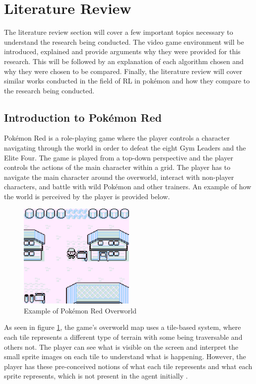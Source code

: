 \section{Literature Review}

The literature review section will cover a few important topics necessary to understand the research being conducted. The video game environment will be introduced, explained and provide arguments why they were provided for this research. This will be followed by an explanation of each algorithm chosen and why they were chosen to be compared. Finally, the literature review will cover similar works conducted in the field of RL in pokémon and how they compare to the research being conducted.

\subsection{Introduction to Pokémon Red}

Pokémon Red is a role-playing game where the player controls a character navigating through the world in order to defeat the eight Gym Leaders and the Elite Four. The game is played from a top-down perspective and the player controls the actions of the main character within a grid. The player has to navigate the main character around the overworld, interact with non-player characters, and battle with wild Pokémon and other trainers. An example of how the world is perceived by the player is provided below\cite{HubZ_1998}. 

\begin{figure}[H]
    \centering
    \includegraphics[width=0.5\textwidth]{figures/red_pallet_town.png}
    \caption{Example of Pokémon Red Overworld}
    \label{fig:pkmn_overworld}
\end{figure}

As seen in figure \ref{fig:pkmn_overworld}, the game's overworld map uses a tile-based system, where each tile represents a different type of terrain with some being traversable and others not. The player can see what is visible on the screen and interpret the small sprite images on each tile to understand what is happening. However, the player has these pre-conceived notions of what each tile represents and what each sprite represents, which is not present in the agent initially \cite{HubZ_1998}. 

